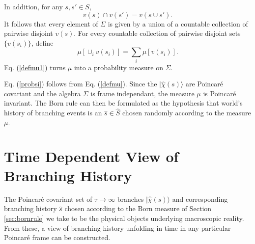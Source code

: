 \documentclass[twocolumn,amsmath,amssymb]{revtex4-1}
\begin{document}
In addition, for any $s, s' \in S$,
\begin{equation}
  \label{intersection}
  v( s) \cap v(s') = v(s \cup s').
\end{equation}
It follows that every element
of $\Sigma$ is given by a union of a countable collection
of pairwise disjoint $v(s)$.
For every countable collection of pairwise
disjoint sets $\{ v( s_i) \}$, define
\begin{equation}
  \label{defmu1}
  \mu[ \cup_i v(s_i) ] = \sum_i \mu[ v( s_i)].
\end{equation}
Eq. (\ref{defmu1}) turns $\mu$ into a probability measure on $\Sigma$.

Eq. (\ref{probsi}) follows from Eq. (\ref{defmu}). Since
the $|\hat{\chi}(s) \rangle $ are Poincar\'{e} covariant and
the algebra $\Sigma$ is frame independant, the measure
$\mu$ is Poincar\'{e} invariant.
The Born rule can then be formulated as the hypothesis that
world's history of branching events
is an $\hat{s} \in \hat{S}$ chosen randomly according to the
measure $\mu$.



\section{\label{sec:framebranching} Time Dependent View of Branching History}

The Poincar\'{e} covariant set of $\tau \rightarrow \infty$ branches $|\hat{\chi}(s) \rangle $
and corresponding branching history $\hat{s}$ chosen according to the Born measure of
Section \ref{sec:bornrule} we take to be the physical objects
underlying macroscopic reality.
From these, a view of branching history
unfolding in time in any particular Poincar\'{e} frame can be
constructed.
\end{document}
